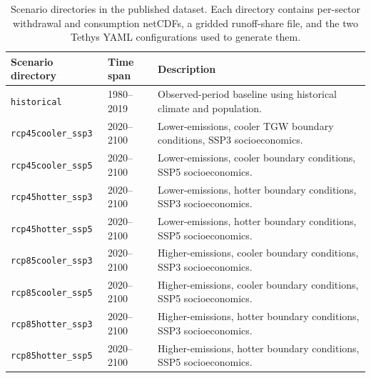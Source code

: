\documentclass[fleqn,10pt]{wlscirep}
\begin{document}
\begin{table}[!ht]
\centering
\begin{tabular}{lll}
\toprule
\textbf{Scenario directory} & \textbf{Time span} & \textbf{Description} \\
\midrule
\texttt{historical}         & 1980--2019 & Observed-period baseline using historical climate and population. \\
\texttt{rcp45cooler\_ssp3}  & 2020--2100 & Lower-emissions, cooler TGW boundary conditions, SSP3 socioeconomics. \\
\texttt{rcp45cooler\_ssp5}  & 2020--2100 & Lower-emissions, cooler boundary conditions, SSP5 socioeconomics. \\
\texttt{rcp45hotter\_ssp3}  & 2020--2100 & Lower-emissions, hotter boundary conditions, SSP3 socioeconomics. \\
\texttt{rcp45hotter\_ssp5}  & 2020--2100 & Lower-emissions, hotter boundary conditions, SSP5 socioeconomics. \\
\texttt{rcp85cooler\_ssp3}  & 2020--2100 & Higher-emissions, cooler boundary conditions, SSP3 socioeconomics. \\
\texttt{rcp85cooler\_ssp5}  & 2020--2100 & Higher-emissions, cooler boundary conditions, SSP5 socioeconomics. \\
\texttt{rcp85hotter\_ssp3}  & 2020--2100 & Higher-emissions, hotter boundary conditions, SSP3 socioeconomics. \\
\texttt{rcp85hotter\_ssp5}  & 2020--2100 & Higher-emissions, hotter boundary conditions, SSP5 socioeconomics. \\
\bottomrule
\end{tabular}
\caption{Scenario directories in the published dataset. Each directory contains per-sector withdrawal and consumption netCDFs, a gridded runoff-share file, and the two Tethys YAML configurations used to generate them.}
\label{tab:scenarios}
\end{table}

\end{document}
